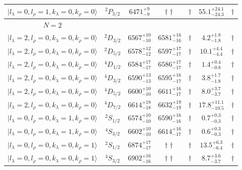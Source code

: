 \begin{tabular}{c c| c c c c c }
$\vert l_{\lambda}\!\!=\!0, l_{\rho}\!\!=\!1, k_{\lambda}\!\!=\!0, k_{\rho}\!\!=\!0 \rangle$ & $^{2}P_{3/2}$ & $6471^{+9}_{-9}$ & $\dagger\dagger$ & $\dagger$ & $55.1^{+24.1}_{-24.3}$ & $\dagger$ \\ 
\hline
 $N=2$  &  &  &  &  &  \\ 
$\vert l_{\lambda}\!\!=\!2, l_{\rho}\!\!=\!0, k_{\lambda}\!\!=\!0, k_{\rho}\!\!=\!0 \rangle$ & $^{2}D_{3/2}$ & $6567^{+10}_{-10}$ & $6581^{+16}_{-16}$ & $\dagger$ & $4.2^{+1.8}_{-1.8}$ & $\dagger$ \\ 
$\vert l_{\lambda}\!\!=\!2, l_{\rho}\!\!=\!0, k_{\lambda}\!\!=\!0, k_{\rho}\!\!=\!0 \rangle$ & $^{2}D_{5/2}$ & $6578^{+12}_{-12}$ & $6597^{+17}_{-17}$ & $\dagger$ & $10.1^{+4.4}_{-4.4}$ & $\dagger$ \\ 
$\vert l_{\lambda}\!\!=\!2, l_{\rho}\!\!=\!0, k_{\lambda}\!\!=\!0, k_{\rho}\!\!=\!0 \rangle$ & $^{4}D_{1/2}$ & $6584^{+17}_{-17}$ & $6586^{+17}_{-17}$ & $\dagger$ & $1.4^{+0.4}_{-0.8}$ & $\dagger$ \\ 
$\vert l_{\lambda}\!\!=\!2, l_{\rho}\!\!=\!0, k_{\lambda}\!\!=\!0, k_{\rho}\!\!=\!0 \rangle$ & $^{4}D_{3/2}$ & $6590^{+13}_{-13}$ & $6595^{+16}_{-17}$ & $\dagger$ & $3.8^{+1.7}_{-1.8}$ & $\dagger$ \\ 
$\vert l_{\lambda}\!\!=\!2, l_{\rho}\!\!=\!0, k_{\lambda}\!\!=\!0, k_{\rho}\!\!=\!0 \rangle$ & $^{4}D_{5/2}$ & $6600^{+10}_{-10}$ & $6611^{+16}_{-17}$ & $\dagger$ & $8.0^{+3.7}_{-3.7}$ & $\dagger$ \\ 
$\vert l_{\lambda}\!\!=\!2, l_{\rho}\!\!=\!0, k_{\lambda}\!\!=\!0, k_{\rho}\!\!=\!0 \rangle$ & $^{4}D_{7/2}$ & $6614^{+18}_{-18}$ & $6632^{+19}_{-19}$ & $\dagger$ & $17.8^{+11.1}_{-10.5}$ & $\dagger$ \\ 
$\vert l_{\lambda}\!\!=\!0, l_{\rho}\!\!=\!0, k_{\lambda}\!\!=\!1, k_{\rho}\!\!=\!0 \rangle$ & $^{2}S_{1/2}$ & $6574^{+10}_{-10}$ & $6590^{+16}_{-16}$ & $\dagger$ & $0.7^{+0.3}_{-0.3}$ & $\dagger$ \\ 
$\vert l_{\lambda}\!\!=\!0, l_{\rho}\!\!=\!0, k_{\lambda}\!\!=\!1, k_{\rho}\!\!=\!0 \rangle$ & $^{4}S_{3/2}$ & $6602^{+10}_{-10}$ & $6614^{+16}_{-17}$ & $\dagger$ & $0.6^{+0.3}_{-0.3}$ & $\dagger$ \\ 
$\vert l_{\lambda}\!\!=\!0, l_{\rho}\!\!=\!0, k_{\lambda}\!\!=\!0, k_{\rho}\!\!=\!1 \rangle$ & $^{2}S_{1/2}$ & $6874^{+17}_{-17}$ & $\dagger\dagger$ & $\dagger$ & $13.5^{+6.3}_{-6.4}$ & $\dagger$ \\ 
$\vert l_{\lambda}\!\!=\!0, l_{\rho}\!\!=\!0, k_{\lambda}\!\!=\!0, k_{\rho}\!\!=\!1 \rangle$ & $^{4}S_{3/2}$ & $6902^{+16}_{-16}$ & $\dagger\dagger$ & $\dagger$ & $8.7^{+3.6}_{-3.7}$ & $\dagger$ \\ 

\end{tabular}
